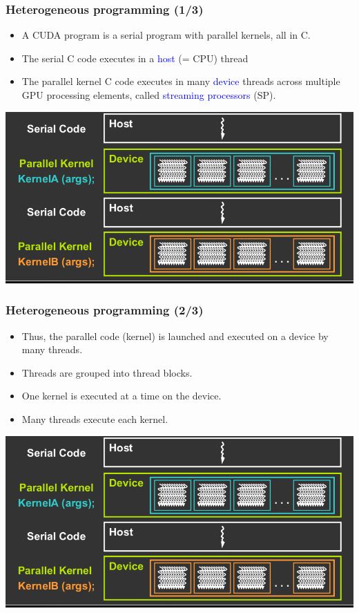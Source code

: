 \begin{frame}[fragile]
\frametitle{Heterogeneous programming (1/3)}

\begin{itemize}
\item A CUDA program is a serial program with parallel kernels, all in C.
\item The serial C code executes in a \textcolor{blue}{host} (= CPU) thread
\item The parallel kernel C code executes in many \textcolor{blue}{device} 
   threads across multiple GPU processing elements, called 
\textcolor{blue}{streaming processors} (SP).
\end{itemize}

\begin{center}
\includegraphics[scale=0.5]{images/Z-17.png}
\end{center}

\end{frame}
\begin{frame}[fragile]
\frametitle{Heterogeneous programming (2/3)}

\begin{itemize}
\item Thus, the parallel code (kernel) is launched and executed on a
      device by many threads.
\item Threads are grouped into thread blocks.
\item One kernel is executed at a time on the device.
\item Many threads execute each kernel.
\end{itemize}

\begin{center}
\includegraphics[scale=0.4]{images/Z-17.png}
\end{center}

\end{frame}
